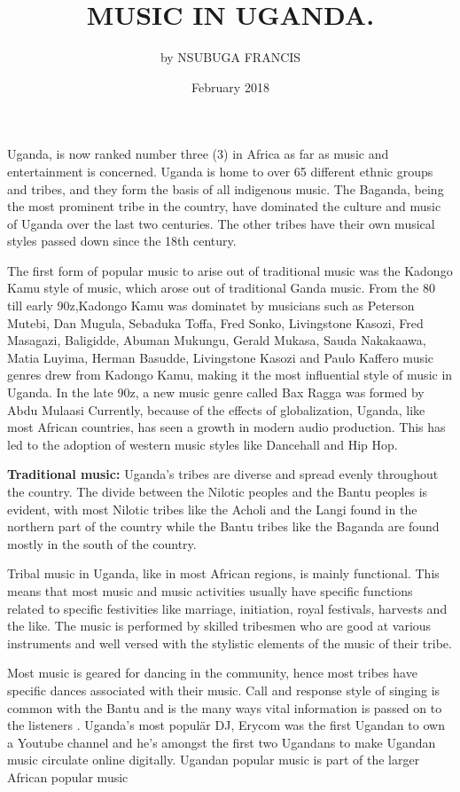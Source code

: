\documentclass{article}
\begin{document}
\title{  MUSIC IN UGANDA.}

\author{by NSUBUGA FRANCIS}
\date{February 2018}
\maketitle
 Uganda, is now ranked number three (3) in Africa as far as music and entertainment is concerned. Uganda is home to over 65 different ethnic groups and tribes, and they form the basis of all indigenous music. The Baganda, being the most prominent tribe in the country, have dominated the culture and music of Uganda over the last two centuries. The other tribes have their own musical styles passed down since the 18th century. 

The first form of popular music to arise out of traditional music was the Kadongo Kamu style of music, which arose out of traditional Ganda music. From the 80 till early 90z,Kadongo Kamu was dominatet by musicians such as Peterson Mutebi, Dan Mugula, Sebaduka Toffa, Fred Sonko, Livingstone Kasozi, Fred Masagazi, Baligidde, Abuman Mukungu, Gerald Mukasa, Sauda Nakakaawa, Matia Luyima, Herman Basudde, Livingstone Kasozi and Paulo Kaffero  music genres drew from Kadongo Kamu, making it the most influential style of music in Uganda. In the late 90z, a new music genre called Bax Ragga was formed by Abdu Mulaasi Currently, because of the effects of globalization, Uganda, like most African countries, has seen a growth in modern audio production. This has led to the adoption of western music styles like Dancehall and Hip Hop.

\textbf{Traditional music:}
Uganda's tribes are diverse and spread evenly throughout the country. The divide between the Nilotic peoples and the Bantu peoples is evident, with most Nilotic tribes like the Acholi and the Langi found in the northern part of the country while the Bantu tribes like the Baganda are found mostly in the south of the country.

Tribal music in Uganda, like in most African regions, is mainly functional. This means that most music and music activities usually have specific functions related to specific festivities like marriage, initiation, royal festivals, harvests and the like. The music is performed by skilled tribesmen who are good at various instruments and well versed with the stylistic elements of the music of their tribe. 

Most music is geared for dancing in the community, hence most tribes have specific dances associated with their music. Call and response style of singing is common with the Bantu  and is the many ways vital information is passed on to the listeners . Uganda's most populär DJ, Erycom was the first Ugandan to own a Youtube channel and he's amongst the first two Ugandans to make Ugandan music circulate online digitally.
Ugandan popular music is part of the larger African popular music
\end{document}

